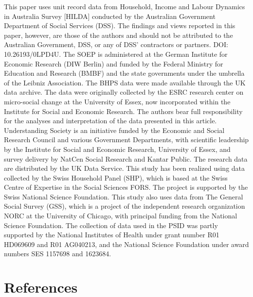 \documentclass[
  12pt,
]{article}
\begin{document}
This paper uses unit record data from Household, Income and Labour
Dynamics in Australia Survey {[}HILDA{]} conducted by the Australian
Government Department of Social Services (DSS). The findings and views
reported in this paper, however, are those of the authors and should not
be attributed to the Australian Government, DSS, or any of DSS'
contractors or partners. DOI: 10.26193/0LPD4U. The SOEP is administered
at the German Institute for Economic Research (DIW Berlin) and funded by
the Federal Ministry for Education and Research (BMBF) and the state
governments under the umbrella of the Leibniz Association. The BHPS data
were made available through the UK data archive. The data were
originally collected by the ESRC research center on micro-social change
at the University of Essex, now incorporated within the Institute for
Social and Economic Research. The authors bear full responsibility for
the analyses and interpretation of the data presented in this article.
Understanding Society is an initiative funded by the Economic and Social
Research Council and various Government Departments, with scientific
leadership by the Institute for Social and Economic Research, University
of Essex, and survey delivery by NatCen Social Research and Kantar
Public. The research data are distributed by the UK Data Service. This
study has been realized using data collected by the Swiss Household
Panel (SHP), which is based at the Swiss Centre of Expertise in the
Social Sciences FORS. The project is supported by the Swiss National
Science Foundation. This study also uses data from The General Social
Survey (GSS), which is a project of the independent research
organization NORC at the University of Chicago, with principal funding
from the National Science Foundation. The collection of data used in the
PSID was partly supported by the National Institutes of Health under
grant number R01 HD069609 and R01 AG040213, and the National Science
Foundation under award numbers SES 1157698 and 1623684.

\theendnotes

\singlespace

\hypertarget{references}{%
\section{References}\label{references}}
\end{document}
